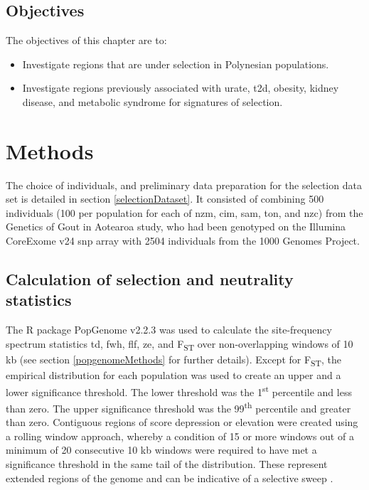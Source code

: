 \documentclass[]{report}
\providecommand{\tightlist}{%
  \setlength{\itemsep}{0pt}\setlength{\parskip}{0pt}}
\begin{document}
\subsection{Objectives}\label{objectives}

The objectives of this chapter are to:

\begin{itemize}
\tightlist
\item
  Investigate regions that are under selection in Polynesian
  populations.
\item
  Investigate regions previously associated with urate, \gls{t2d},
  obesity, kidney disease, and metabolic syndrome for signatures of
  selection.
\end{itemize}

\section{Methods}\label{methods}

The choice of individuals, and preliminary data preparation for the
selection data set is detailed in section \ref{selectionDataset}. It
consisted of combining 500 individuals (100 per population for each of
\gls{nzm}, \gls{cim}, \gls{sam}, \gls{ton}, and \gls{nzc}) from the
Genetics of Gout in Aotearoa study, who had been genotyped on the
Illumina CoreExome v24 \gls{snp} array with 2504 individuals from the
1000 Genomes Project.

\subsection{Calculation of selection and neutrality
statistics}\label{calcSel}

The R package PopGenome v2.2.3 \citep{Pfeifer2014} was used to calculate
the site-frequency spectrum statistics \gls{td}, \gls{fwh}, \gls{flf},
\gls{ze}, and F\textsubscript{ST} over non-overlapping windows of 10 kb
(see section \ref{popgenomeMethods} for further details). Except for
F\textsubscript{ST}, the empirical distribution for each population was
used to create an upper and a lower significance threshold. The lower
threshold was the 1\textsuperscript{st} percentile and less than zero.
The upper significance threshold was the 99\textsuperscript{th}
percentile and greater than zero. Contiguous regions of score depression
or elevation were created using a rolling window approach, whereby a
condition of 15 or more windows out of a minimum of 20 consecutive 10 kb
windows were required to have met a significance threshold in the same
tail of the distribution. These represent extended regions of the genome
and can be indicative of a selective sweep \citep{Carlson2005}.
\end{document}
